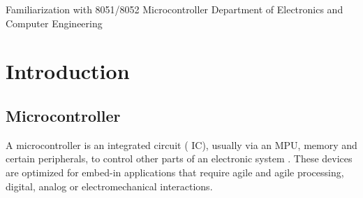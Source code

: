 \documentclass[a4paper,12pt]{article}
\begin{document}
{ Familiarization with 8051/8052 Microcontroller}
{Department of Electronics and Computer Engineering}




\tableofcontents
\pagebreak
\listoffigures
\pagebreak
{}
\section{Introduction} 
\subsection{Microcontroller}
A microcontroller is an integrated circuit ( IC), usually via an MPU, memory and certain peripherals, to control other parts of an electronic system . 
These devices are optimized for embed-in applications that require agile and agile processing, digital, analog or electromechanical interactions.
\end{document}
